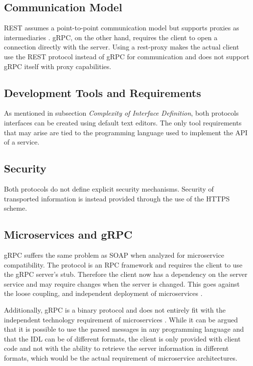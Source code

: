 \documentclass[conference]{IEEEtran}
\begin{document}
\subsection{Communication Model}

REST assumes a point-to-point communication model but supports proxies as intermediaries \cite{wagh2012comparative}. gRPC, on the other hand, requires the client to open a connection directly with the server. Using a rest-proxy makes the actual client use the REST protocol instead of gRPC for communication and does not support gRPC itself with proxy capabilities.

\subsection{Development Tools and Requirements}

As mentioned in subsection \textit{Complexity of Interface Definition}, both protocols interfaces can be created using default text editors. The only tool requirements that may arise are tied to the programming language used to implement the API of a service.

\subsection{Security}

Both protocols do not define explicit security mechanisms. Security of transported information is instead provided through the use of the HTTPS scheme.

\subsection{Microservices and gRPC}
\label{sec:mgrpc}

gRPC suffers the same problem as SOAP when analyzed for microservice compatibility. The protocol is an RPC framework and requires the client to use the gRPC server's stub. Therefore the client now has a dependency on the server service and may require changes when the server is changed. This goes against the loose coupling, and independent deployment of microservices \cite{karmel2016nist}.

Additionally, gRPC is a binary protocol and does not entirely fit with the independent technology requirement of microservices \cite{karmel2016nist}. While it can be argued that it is possible to use the parsed messages in any programming language and that the IDL can be of different formats, the client is only provided with client code and not with the ability to retrieve the server information in different formats, which would be the actual requirement of microservice architectures.
\end{document}
